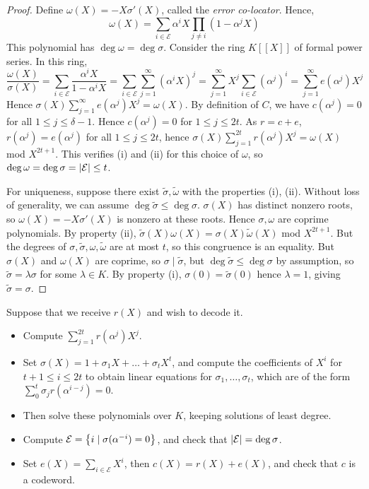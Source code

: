 \begin{proof}
    Define \( \omega(X) = -X\sigma'(X) \), called the \emph{error co-locator}.
    Hence,
    \[ \omega(X) = \sum_{i \in \mathcal E} \alpha^i X \prod_{j \neq i} (1 - \alpha^j X) \]
    This polynomial has \( \deg \omega = \deg \sigma \).
    Consider the ring \( K[\![X]\!] \) of formal power series.
    In this ring,
    \[ \frac{\omega(X)}{\sigma(X)} = \sum_{i \in \mathcal E} \frac{\alpha^i X}{1 - \alpha^i X} = \sum_{i \in \mathcal E} \sum_{j = 1}^\infty (\alpha^i X)^j = \sum_{j=1}^\infty X^j \sum_{i \in \mathcal E} (\alpha^j)^i = \sum_{j=1}^\infty e(\alpha^j) X^j \]
    Hence \( \sigma(X) \sum_{j=1}^\infty e(\alpha^j) X^j = \omega(X) \).
    By definition of \( C \), we have \( c(\alpha^j) = 0 \) for all \( 1 \leq j \leq \delta - 1 \).
    Hence \( c(\alpha^j) = 0 \) for \( 1 \leq j \leq 2t \).
    As \( r = c + e \), \( r(\alpha^j) = e(\alpha^j) \) for all \( 1 \leq j \leq 2t \), hence \( \sigma(X) \sum_{j=1}^{2t} r(\alpha^j) X^j = \omega(X) \) mod \( X^{2t+1} \).
    This verifies (i) and (ii) for this choice of \( \omega \), so \( \deg \omega = \deg \sigma = \abs{\mathcal E} \leq t \).

    For uniqueness, suppose there exist \( \widetilde \sigma, \widetilde \omega \) with the properties (i), (ii).
    Without loss of generality, we can assume \( \deg \widetilde \sigma \leq \deg \sigma \).
    \( \sigma(X) \) has distinct nonzero roots, so \( \omega(X) = -X\sigma'(X) \) is nonzero at these roots.
    Hence \( \sigma, \omega \) are coprime polynomials.
    By property (ii), \( \widetilde \sigma(X) \omega(X) = \sigma(X) \widetilde \omega(X) \) mod \( X^{2t+1} \).
    But the degrees of \( \sigma, \widetilde \sigma, \omega, \widetilde \omega \) are at most \( t \), so this congruence is an equality.
    But \( \sigma(X) \) and \( \omega(X) \) are coprime, so \( \sigma \mid \widetilde \sigma \), but \( \deg \widetilde \sigma \leq \deg \sigma \) by assumption, so \( \widetilde \sigma = \lambda \sigma \) for some \( \lambda \in K \).
    By property (i), \( \sigma(0) = \widetilde\sigma(0) \) hence \( \lambda = 1 \), giving \( \widetilde \sigma = \sigma \).
\end{proof}
Suppose that we receive \( r(X) \) and wish to decode it.
\begin{itemize}
    \item Compute \( \sum_{j=1}^{2t} r(\alpha^j) X^j \).
    \item Set \( \sigma(X) = 1 + \sigma_1 X + \dots + \sigma_t X^t \), and compute the coefficients of \( X^i \) for \( t + 1 \leq i \leq 2t \) to obtain linear equations for \( \sigma_1, \dots, \sigma_t \), which are of the form \( \sum_0^t \sigma_j r(\alpha^{i-j}) = 0 \).
    \item Then solve these polynomials over \( K \), keeping solutions of least degree.
    \item Compute \( \mathcal E = \qty{i \mid \sigma(\alpha^{-i}) = 0} \), and check that \( \abs{\mathcal E} = \deg \sigma \).
    \item Set \( e(X) = \sum_{i \in \mathcal E} X^i \), then \( c(X) = r(X) + e(X) \), and check that \( c \) is a codeword.
\end{itemize}
